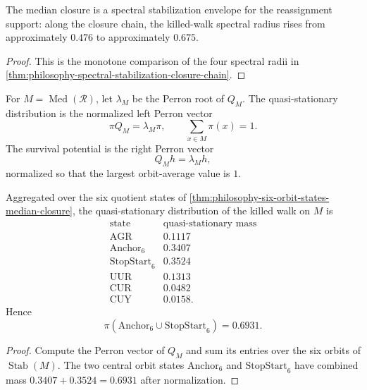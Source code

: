 \begin{corollary}
\label{cor:philosophy-spectral-meaning-median-closure}
The median closure is a spectral stabilization envelope for the
reassignment support: along the closure chain, the killed-walk spectral
radius rises from approximately $0.476$ to approximately $0.675$.
\end{corollary}
\begin{proof}
This is the monotone comparison of the four spectral radii in
\autoref{thm:philosophy-spectral-stabilization-closure-chain}.
\end{proof}

\begin{definition}
\label{def:philosophy-quasi-stationary-survival-potential}
For $M=\operatorname{Med}(\mathcal{R})$, let $\lambda_M$ be the Perron
root of $Q_M$. The quasi-stationary distribution is the normalized left
Perron vector
$$
  \pi Q_M=\lambda_M\pi,
  \qquad
  \sum_{x\in M}\pi(x)=1.
$$
The survival potential is the right Perron vector
$$
  Q_Mh=\lambda_Mh,
$$
normalized so that the largest orbit-average value is $1$.
\end{definition}

\begin{theorem}
\label{thm:philosophy-quasi-stationary-quotient-mass}
Aggregated over the six quotient states of
\autoref{thm:philosophy-six-orbit-states-median-closure}, the
quasi-stationary distribution of the killed walk on $M$ is
$$
\begin{array}{c|r}
  \text{state} & \text{quasi-stationary mass}\\
  \hline
  \mathrm{AGR} & 0.1117\\
  \mathrm{Anchor}_{6} & 0.3407\\
  \mathrm{StopStart}_{6} & 0.3524\\
  \mathrm{UUR} & 0.1313\\
  \mathrm{CUR} & 0.0482\\
  \mathrm{CUY} & 0.0158.
\end{array}
$$
Hence
$$
  \pi(\mathrm{Anchor}_{6}\cup\mathrm{StopStart}_{6})
  =
  0.6931.
$$
\end{theorem}
\begin{proof}
Compute the Perron vector of $Q_M$ and sum its entries over the six
orbits of $\operatorname{Stab}(M)$. The two central orbit states
$\mathrm{Anchor}_{6}$ and $\mathrm{StopStart}_{6}$ have combined mass
$0.3407+0.3524=0.6931$ after normalization.
\end{proof}

